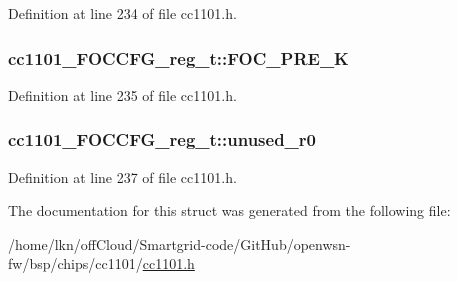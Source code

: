 Definition at line 234 of file cc1101.\+h.

\subsubsection[{\texorpdfstring{F\+O\+C\+\_\+\+P\+R\+E\+\_\+K}{FOC_PRE_K}}]{ cc1101\+\_\+\+F\+O\+C\+C\+F\+G\+\_\+reg\+\_\+t\+::\+F\+O\+C\+\_\+\+P\+R\+E\+\_\+K}\hypertarget{structcc1101___f_o_c_c_f_g__reg__t_add5c4ce00d20d11efb79734b86532018}{}\label{structcc1101___f_o_c_c_f_g__reg__t_add5c4ce00d20d11efb79734b86532018}


Definition at line 235 of file cc1101.\+h.

\subsubsection[{\texorpdfstring{unused\+\_\+r0}{unused_r0}}]{ cc1101\+\_\+\+F\+O\+C\+C\+F\+G\+\_\+reg\+\_\+t\+::unused\+\_\+r0}\hypertarget{structcc1101___f_o_c_c_f_g__reg__t_adfd9370933fd173d5bdbc68e1b3c07c9}{}\label{structcc1101___f_o_c_c_f_g__reg__t_adfd9370933fd173d5bdbc68e1b3c07c9}


Definition at line 237 of file cc1101.\+h.



The documentation for this struct was generated from the following file\+:\begin{DoxyCompactItemize}
\item 
/home/lkn/off\+Cloud/\+Smartgrid-\/code/\+Git\+Hub/openwsn-\/fw/bsp/chips/cc1101/\hyperlink{cc1101_8h}{cc1101.\+h}\end{DoxyCompactItemize}
